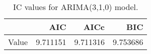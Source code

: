 \begin{table}[ht]
\centering
\begin{tabular}{rrrr}
  \hline
 & AIC & AICc & BIC \\ 
  \hline
Value & 9.711151 & 9.711316 & 9.753686 \\ 
   \hline
\end{tabular}
\caption{IC values for ARIMA(3,1,0) model.}
\end{table}